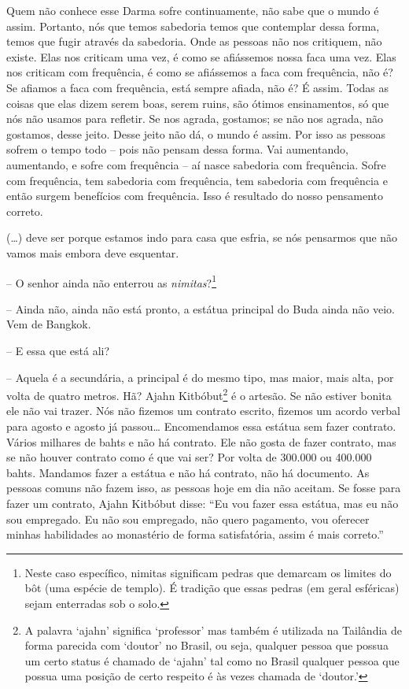 Quem não conhece esse Darma sofre continuamente, não sabe que o
mundo é assim. Portanto, nós que temos sabedoria temos que contemplar
dessa forma, temos que fugir através da sabedoria. Onde as pessoas não
nos critiquem, não existe. Elas nos criticam uma vez, é como se
afiássemos nossa faca uma vez. Elas nos criticam com frequência, é como
se afiássemos a faca com frequência, não é? Se afiamos a faca com
frequência, está sempre afiada, não é? É assim. Todas as coisas que
elas dizem serem boas, serem ruins, são ótimos ensinamentos, só que nós
não usamos para refletir. Se nos agrada, gostamos; se não nos agrada,
não gostamos, desse jeito. Desse jeito não dá, o mundo é assim. Por
isso as pessoas sofrem o tempo todo – pois não pensam dessa forma. Vai
aumentando, aumentando, e sofre com frequência – aí nasce sabedoria com
frequência. Sofre com frequência, tem sabedoria com frequência, tem
sabedoria com frequência e então surgem benefícios com frequência. Isso
é resultado do nosso pensamento correto.

(…) deve ser porque estamos indo para casa que esfria, se nós
pensarmos que não vamos mais embora deve esquentar. 

-- O senhor ainda não enterrou as \textit{nimitas}?\footnote{Neste
caso específico, nimitas significam pedras que demarcam os limites do
bôt (uma espécie de templo). É tradição que essas pedras (em geral
esféricas) sejam enterradas sob o solo.}

-- Ainda não, ainda não está pronto, a estátua principal do Buda
ainda não veio. Vem de Bangkok.

-- E essa que está ali?

-- Aquela é a secundária, a principal é do mesmo tipo, mas maior,
mais alta, por volta de quatro metros. Hã? Ajahn Kitbóbut\footnote{A
palavra ‘ajahn’ significa ‘professor’ mas também é utilizada na
Tailândia de forma parecida com ‘doutor’ no Brasil, ou seja, qualquer
pessoa que possua um certo status é chamado de ‘ajahn’ tal como no
Brasil qualquer pessoa que possua uma posição de certo respeito é às
vezes chamada de ‘doutor.’} é o artesão. Se não estiver bonita ele não
vai trazer. Nós não fizemos um contrato escrito, fizemos um acordo
verbal para agosto e agosto já passou… Encomendamos essa estátua sem
fazer contrato. Vários milhares de bahts e não há contrato. Ele não
gosta de fazer contrato, mas se não houver contrato como é que vai ser?
Por volta de 300.000 ou 400.000 bahts. Mandamos fazer a estátua e não
há contrato, não há documento. As pessoas comuns não fazem isso, as
pessoas hoje em dia não aceitam. Se fosse para fazer um contrato, Ajahn
Kitbóbut disse: “Eu vou fazer essa estátua, mas eu não sou empregado.
Eu não sou empregado, não quero pagamento, vou oferecer minhas
habilidades ao monastério de forma satisfatória, assim é mais correto.”

